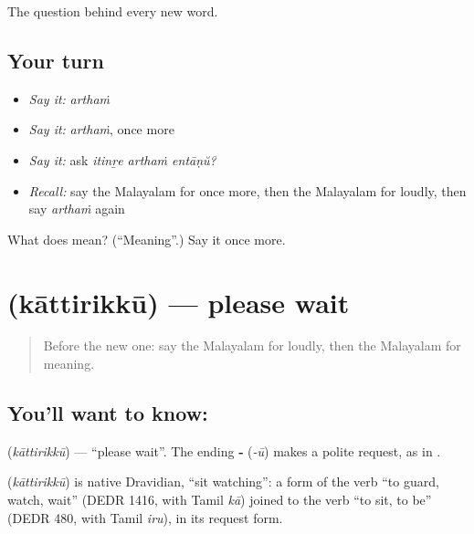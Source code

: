 \begin{grammarlens}[title={What you've built}]
The question behind every new word.
\end{grammarlens}

\subsection*{Your turn}
\begin{itemize}
\raggedright
  \item \emph{Say it:} \emph{arthaṁ}
  \item \emph{Say it:} \emph{arthaṁ}, once more
  \item \emph{Say it:} ask \emph{itinṟe arthaṁ entāṇŭ?}
  \item \emph{Recall:} say the Malayalam for once more, then the Malayalam for loudly, then say \emph{arthaṁ} again
\end{itemize}

\begin{tcolorbox}[breakable,colback=teal!4,colframe=teal!35!black,title={Before you move on}]
What does  mean? (\textquotedblleft{}Meaning\textquotedblright{}.) Say it once more.
\end{tcolorbox}
\section[\texorpdfstring{\ml{കാത്തിരിക്കൂ} (kāttirikkū)}{കാത്തിരിക്കൂ (kāttirikkū)}]{ (kāttirikkū) — please wait}

\label{lesson:ML-C119-wait}



\begin{quote}
Before the new one: say the Malayalam for loudly, then the Malayalam for meaning.
\end{quote}

\subsection*{You'll want to know: }
\textbf{} (\emph{kāttirikkū}) — \textquotedblleft{}please wait\textquotedblright{}. The ending \textbf{‑} (\emph{-ū}) makes a polite request, as in \textbf{}.

\begin{cousinweb}
\textbf{} (\emph{kāttirikkū}) is native Dravidian, \textquotedblleft{}sit watching\textquotedblright{}: a form of the verb \textquotedblleft{}to guard, watch, wait\textquotedblright{} (DEDR 1416, with Tamil \emph{kā}) joined to the verb \textquotedblleft{}to sit, to be\textquotedblright{} (DEDR 480, with Tamil \emph{iru}), in its request form.
\end{cousinweb}

